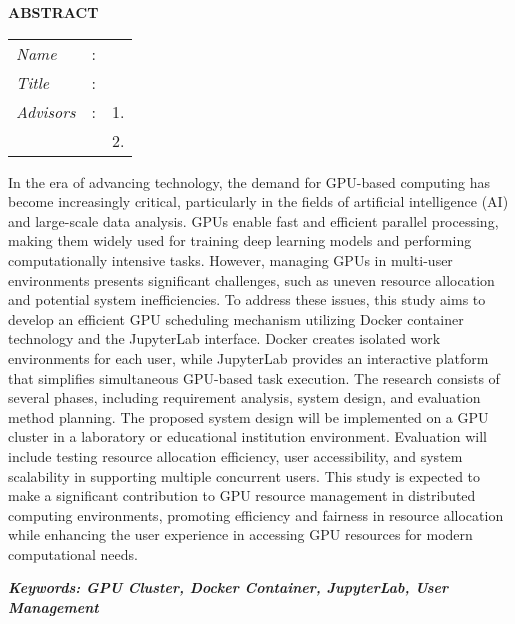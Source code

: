\begin{center}
  \large\textbf{ABSTRACT}
\end{center}


\vspace{2ex}

\begingroup
\setlength{\tabcolsep}{0pt}

\noindent
\begin{tabularx}{\textwidth}{l >{\centering}m{3em} X}
  \emph{Name}     & : & \name{}         \\

  \emph{Title}    & : & \engtatitle{}   \\

  \emph{Advisors} & : & 1. \advisor{}   \\
                  &   & 2. \coadvisor{} \\
\end{tabularx}
\endgroup

In the era of advancing technology, the demand for GPU-based computing has become
increasingly critical, particularly in the fields of artificial intelligence (AI) and large-scale data analysis. GPUs enable fast and efficient parallel processing, making them widely used for training deep learning models and performing computationally intensive tasks. However, managing GPUs in multi-user environments presents significant challenges, such as uneven resource allocation and potential system inefficiencies. To address these issues, this study aims to develop an
efficient GPU scheduling mechanism utilizing Docker container technology and the JupyterLab interface. Docker creates isolated work environments for each user, while JupyterLab provides an interactive platform that simplifies simultaneous GPU-based task execution. The research consists of several phases, including requirement analysis, system design, and evaluation method planning. The proposed system design will be implemented on a GPU cluster in a laboratory or educational institution environment. Evaluation will include testing resource allocation
efficiency, user accessibility, and system scalability in supporting multiple concurrent users. This study is expected to make a significant contribution to GPU resource management in distributed computing environments, promoting efficiency and fairness in resource allocation while enhancing the user experience in accessing GPU resources for modern computational needs.

\textbf{\textit{Keywords: GPU Cluster, Docker Container, JupyterLab, User Management}}
